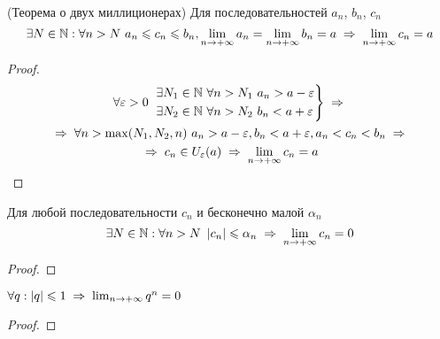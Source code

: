 \begin{theorem}
    (Теорема о двух миллиционерах) Для последовательностей $a_n$, $b_n$, $c_n$
    \[ \exists N \in \N: \forall n > N\ a_n \le c_n \le b_n, \limpinf a_n = \limpinf b_n = a \thus \limpinf c_n = a \]
\end{theorem}
\begin{proof}
    \begin{multline*}
        \forall \varepsilon > 0\ 
        \begin{rcases}
            \exists N_1 \in \N\ \forall n > N_1\ a_n > a - \varepsilon \\
            \exists N_2 \in \N\ \forall n > N_2\ b_n < a + \varepsilon
        \end{rcases} \thus \\
        \thus \forall n > \max(N_1, N_2, n)\ a_n > a - \varepsilon, b_n < a + \varepsilon, a_n < c_n < b_n \thus \\
        \thus c_n \in U_\varepsilon(a) \thus
        \limpinf c_n = a
    \end{multline*}
\end{proof}

\begin{theorem}
    Для любой последовательности $c_n$ и бесконечно малой $\alpha_n$ 
    \[ \exists N \in \N: \forall n > N\ \abs{c_n} \le \alpha_n \thus \limpinf c_n = 0 \]
\end{theorem}
\begin{proof}
\end{proof}

\begin{theorem}
    $\forall q : \abs{q} \le 1 \thus \limpinf{q^n} = 0$
\end{theorem}
\begin{proof}
\end{proof}


